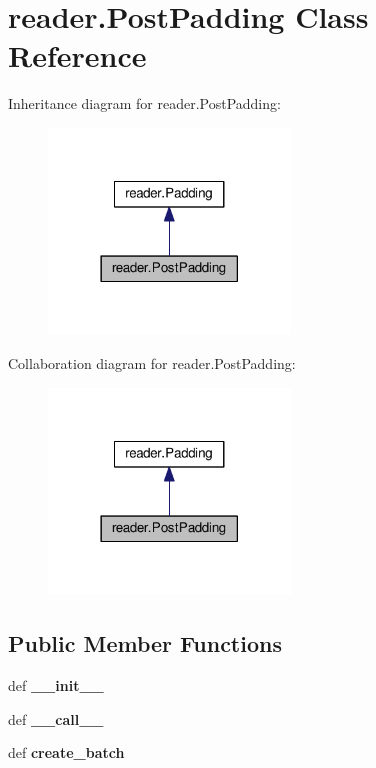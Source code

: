 \hypertarget{classreader_1_1PostPadding}{}\section{reader.\+Post\+Padding Class Reference}
\label{classreader_1_1PostPadding}


Inheritance diagram for reader.\+Post\+Padding\+:
\nopagebreak
\begin{figure}[H]
\begin{center}
\leavevmode
\includegraphics[width=182pt]{classreader_1_1PostPadding__inherit__graph}
\end{center}
\end{figure}


Collaboration diagram for reader.\+Post\+Padding\+:
\nopagebreak
\begin{figure}[H]
\begin{center}
\leavevmode
\includegraphics[width=182pt]{classreader_1_1PostPadding__coll__graph}
\end{center}
\end{figure}
\subsection*{Public Member Functions}
\begin{DoxyCompactItemize}
\item 
def {\bfseries \+\_\+\+\_\+init\+\_\+\+\_\+}\hypertarget{classreader_1_1PostPadding_a3128e2a8c5d93864d05a92a84cdd5426}{}\label{classreader_1_1PostPadding_a3128e2a8c5d93864d05a92a84cdd5426}

\item 
def {\bfseries \+\_\+\+\_\+call\+\_\+\+\_\+}\hypertarget{classreader_1_1PostPadding_ad2d2976fbc340dc7a98d36acb56709b6}{}\label{classreader_1_1PostPadding_ad2d2976fbc340dc7a98d36acb56709b6}

\item 
def {\bfseries create\+\_\+batch}\hypertarget{classreader_1_1PostPadding_a52cd94a1d3f61ecc71daad770abc31fc}{}\label{classreader_1_1PostPadding_a52cd94a1d3f61ecc71daad770abc31fc}

\end{DoxyCompactItemize}

